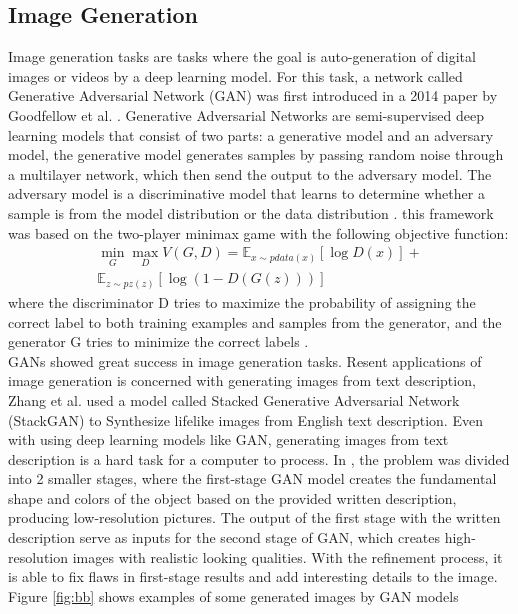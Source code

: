\documentclass[12pt,twocolumn,a4paper]{article}
\begin{document}
    \subsection{Image Generation}
    \hspace{0.3cm} Image generation tasks are tasks where the goal is auto-generation of digital images or videos by a deep learning model. For this task, a network called Generative Adversarial Network (GAN) was first introduced in a 2014 paper by Goodfellow et al. \cite{Goodfellow2014-cu}. Generative Adversarial Networks are semi-supervised deep learning models that consist of two parts: a generative model and an adversary model, the generative model generates samples by passing random noise through a multilayer network, which then send the output to the adversary model. The adversary model is a discriminative model that learns to determine whether a sample is from the model distribution or the data distribution \cite{Goodfellow2014-cu}. this framework was based on the two-player minimax game with the following objective function:
     \begin{equation*}
        \begin{aligned}
        \min_{G}\max_{D} V(G,D) = \mathbb{E}_{x\sim pdata(x)}[\log D(x)] +\\
        \mathbb{E}_{z\sim pz(z)}[\log (1-D(G(z)))]
        \end{aligned}
     \end{equation*}
    where the discriminator D tries to maximize the probability of assigning the correct label to both training examples and samples from the generator, and the generator G tries to minimize the correct labels \cite{Goodfellow2014-cu}.\\
    \-\hspace{0.5cm} GANs showed great success in image generation tasks. Resent applications of image generation is concerned with generating images from text description, Zhang et al. \cite{Zhang2016-pu} used  a model called Stacked Generative Adversarial Network (StackGAN) to Synthesize lifelike images from English text description. Even with using deep learning models like GAN, generating images from text description is a hard task for a computer to process. In \cite{Zhang2016-pu}, the problem was divided into 2 smaller stages, where the first-stage GAN model creates the fundamental shape and colors of the object based on the provided written description, producing low-resolution pictures. The output of the first stage with the written description serve as inputs for the second stage of GAN, which creates high-resolution images with realistic looking qualities. With the refinement process, it is able to fix flaws in first-stage results and add interesting details to the image. Figure \ref{fig:bb} shows examples of some generated images by GAN models \\
\end{document}
